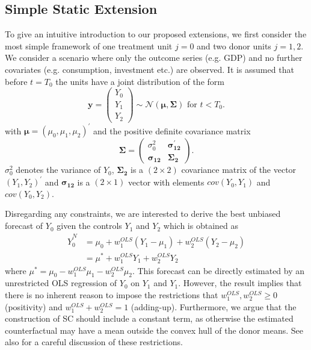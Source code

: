 \subsection{Simple Static Extension}
To give an intuitive introduction to our proposed extensions, we first consider the most simple framework of one treatment unit $j = 0$ and two donor units $j = 1,2$. We consider a scenario where only the outcome series (e.g. \ac{GDP}) and no further covariates (e.g. consumption, investment etc.) are observed. It is assumed that before $t = T_0$ the units have a joint distribution of the form 
\[
\boldsymbol{y} = \begin{pmatrix} Y_0\\ Y_1\\ Y_2 \end{pmatrix} \sim \mathcal{N}(\boldsymbol{\mu},\boldsymbol{\Sigma})
\text{ for } t<T_0.
\] 
with $\boldsymbol{\mu} = \left(\mu_0, \mu_1, \mu_2  \right)^\prime$ and the positive definite covariance matrix
\[
\boldsymbol{\Sigma} = \begin{pmatrix} \sigma_0^2 & \boldsymbol{\sigma_{12}^\prime} \\
	\boldsymbol{\sigma_{12}} & \boldsymbol{\Sigma_2} \end{pmatrix}.
\] 
$\sigma_0^2$ denotes the variance of $Y_0$, $\boldsymbol{\Sigma_2}$ is a $(2 \times 2)$ covariance matrix of the vector $(Y_1, Y_2)^\prime$ and $\boldsymbol{\sigma_{12}}$ is a $(2 \times 1)$ vector with elements $cov(Y_0, Y_1)$ and $cov(Y_0, Y_2)$.

Disregarding any constraints, we are interested to derive the best unbiased forecast of $Y_0$ given the controls $Y_1$ and $Y_2$ which is obtained as
\begin{equation*}
	\begin{split}
		\widehat{Y}^{N}_{0} & = \mu_0 + w_1^{OLS} (Y_1 - \mu_1) + w_2^{OLS} (Y_2 - \mu_2) \\
		& = \mu^* + w_1^{OLS} Y_1 + w_2^{OLS} Y_2
	\end{split}
\end{equation*}
where $\mu^* = \mu_0 - w_1^{OLS} \mu_1 - w_2^{OLS} \mu_2$. This forecast can be directly estimated by an unrestricted \ac{OLS} regression of $Y_0$ on $Y_1$ and $Y_1$. However, the result implies that there is no inherent reason to impose the restrictions that $w_1^{OLS}, w_2^{OLS} \geq 0$ (positivity) and $w_1^{OLS} + w_2^{OLS} = 1$ (adding-up). Furthermore, we argue that the construction of \ac{SC} should include a constant term, as otherwise the estimated counterfactual may have a mean outside the convex hull of the donor means. See also \cite{doudchenko:2016} for a careful discussion of these restrictions. 

